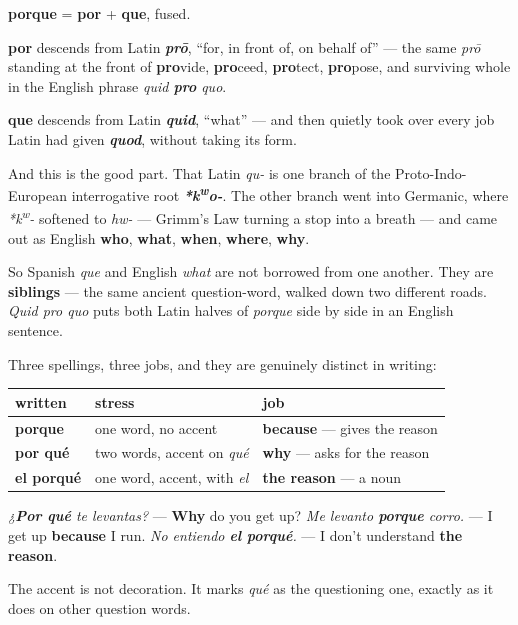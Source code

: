 \begin{cousinweb}
\textbf{porque} = \textbf{por} + \textbf{que}, fused.

\textbf{por} descends from Latin \emph{\textbf{prō}}, \textquotedblleft{}for, in front of, on behalf of\textquotedblright{} — the same \emph{prō} standing at the front of \textbf{pro}vide, \textbf{pro}ceed, \textbf{pro}tect, \textbf{pro}pose, and surviving whole in the English phrase \emph{quid \textbf{pro} quo}.

\textbf{que} descends from Latin \emph{\textbf{quid}}, \textquotedblleft{}what\textquotedblright{} — and then quietly took over every job Latin had given \emph{\textbf{quod}}, without taking its form.

And this is the good part. That Latin \emph{qu-} is one branch of the Proto-Indo-European interrogative root \emph{\textbf{*k\textsuperscript{w}o-}}. The other branch went into Germanic, where \emph{*k\textsuperscript{w}-} softened to \emph{hw-} — Grimm's Law turning a stop into a breath — and came out as English \textbf{who}, \textbf{what}, \textbf{when}, \textbf{where}, \textbf{why}.

So Spanish \emph{que} and English \emph{what} are not borrowed from one another. They are \textbf{siblings} — the same ancient question-word, walked down two different roads. \emph{Quid pro quo} puts both Latin halves of \emph{porque} side by side in an English sentence.
\end{cousinweb}

\begin{grammarlens}[title={Grammar Lens: porque, por qué, el porqué}]
Three spellings, three jobs, and they are genuinely distinct in writing:

\noindent
\begin{tabularx}{\linewidth}{@{}>{\raggedright\arraybackslash}X>{\raggedright\arraybackslash}X>{\raggedright\arraybackslash}X@{}}
\toprule
\textbf{written} & \textbf{stress} & \textbf{job} \\
\midrule
\textbf{porque} & one word, no accent & \textbf{because} — gives the reason \\
\textbf{por qué} & two words, accent on \emph{qué} & \textbf{why} — asks for the reason \\
\textbf{el porqué} & one word, accent, with \emph{el} & \textbf{the reason} — a noun \\
\bottomrule
\end{tabularx}

\emph{¿\textbf{Por qué} te levantas?} — \textbf{Why} do you get up? \emph{Me levanto \textbf{porque} corro.} — I get up \textbf{because} I run. \emph{No entiendo \textbf{el porqué}.} — I don't understand \textbf{the reason}.

The accent is not decoration. It marks \emph{qué} as the questioning one, exactly as it does on other question words.
\end{grammarlens}

